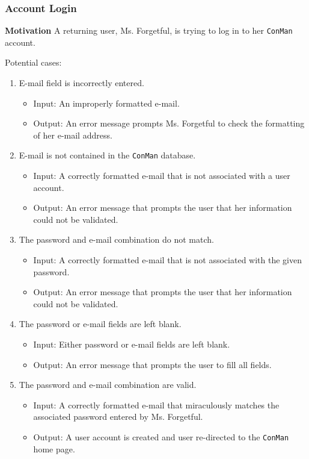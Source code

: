 \subsubsection{Account Login}
\textbf{Motivation} A returning user, Ms. Forgetful, is trying to log in to
her \texttt{ConMan} account.

Potential cases:
\begin{enumerate}
    \item E-mail field is incorrectly entered.
        \begin{itemize}
            \item Input: An improperly formatted e-mail.
            \item Output: An error message prompts Ms. Forgetful to check the
formatting of her e-mail address.
        \end{itemize}
    \item E-mail is not contained in the \texttt{ConMan} database.
        \begin{itemize}
            \item Input: A correctly formatted e-mail that is not associated
with a user account.
            \item Output: An error message that prompts the user that her
information could not be validated.
        \end{itemize}
    \item The password and e-mail combination do not match.
        \begin{itemize}
            \item Input: A correctly formatted e-mail that is not associated
with the given password.
            \item Output: An error message that prompts the user that her
information could not be validated.
        \end{itemize}
    \item The password or e-mail fields are left blank.
        \begin{itemize}
            \item Input: Either password or e-mail fields are left blank.
            \item Output: An error message that prompts the user to fill all
fields.
        \end{itemize}
    \item The password and e-mail combination are valid.
        \begin{itemize}
            \item Input: A correctly formatted e-mail that miraculously
matches the associated password entered by Ms. Forgetful.
            \item Output: A user account is created and user re-directed to
the \texttt{ConMan} home page.
        \end{itemize}
\end{enumerate}

